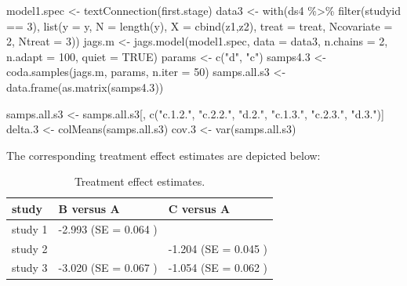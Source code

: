\documentclass[
  letterpaper,
  DIV=11,
  numbers=noendperiod]{scrreprt}
\newenvironment{Shaded}{\begin{snugshade}}{\end{snugshade}}
\newcommand{\AttributeTok}[1]{\textcolor[rgb]{0.40,0.45,0.13}{#1}}
\newcommand{\ConstantTok}[1]{\textcolor[rgb]{0.56,0.35,0.01}{#1}}
\newcommand{\DecValTok}[1]{\textcolor[rgb]{0.68,0.00,0.00}{#1}}
\newcommand{\FloatTok}[1]{\textcolor[rgb]{0.68,0.00,0.00}{#1}}
\newcommand{\FunctionTok}[1]{\textcolor[rgb]{0.28,0.35,0.67}{#1}}
\newcommand{\NormalTok}[1]{\textcolor[rgb]{0.00,0.23,0.31}{#1}}
\newcommand{\OtherTok}[1]{\textcolor[rgb]{0.00,0.23,0.31}{#1}}
\newcommand{\SpecialCharTok}[1]{\textcolor[rgb]{0.37,0.37,0.37}{#1}}
\newcommand{\StringTok}[1]{\textcolor[rgb]{0.13,0.47,0.30}{#1}}
\begin{document}
\begin{Shaded}
\begin{Highlighting}[]
\NormalTok{model1.spec }\OtherTok{\textless{}{-}} \FunctionTok{textConnection}\NormalTok{(first.stage) }
\NormalTok{data3 }\OtherTok{\textless{}{-}} \FunctionTok{with}\NormalTok{(ds4 }\SpecialCharTok{\%\textgreater{}\%} \FunctionTok{filter}\NormalTok{(studyid }\SpecialCharTok{==} \DecValTok{3}\NormalTok{), }
              \FunctionTok{list}\NormalTok{(}\AttributeTok{y =}\NormalTok{ y,}
                   \AttributeTok{N =} \FunctionTok{length}\NormalTok{(y), }
                   \AttributeTok{X =} \FunctionTok{cbind}\NormalTok{(z1,z2),  }
                   \AttributeTok{treat =}\NormalTok{ treat,}
                   \AttributeTok{Ncovariate =} \DecValTok{2}\NormalTok{, }
                   \AttributeTok{Ntreat =} \DecValTok{3}\NormalTok{))}
\NormalTok{jags.m }\OtherTok{\textless{}{-}} \FunctionTok{jags.model}\NormalTok{(model1.spec, }\AttributeTok{data =}\NormalTok{ data3, }\AttributeTok{n.chains =} \DecValTok{2}\NormalTok{, }\AttributeTok{n.adapt =} \DecValTok{100}\NormalTok{,}
                     \AttributeTok{quiet =} \ConstantTok{TRUE}\NormalTok{)}
\NormalTok{params }\OtherTok{\textless{}{-}} \FunctionTok{c}\NormalTok{(}\StringTok{"d"}\NormalTok{, }\StringTok{"c"}\NormalTok{) }
\NormalTok{samps4}\FloatTok{.3} \OtherTok{\textless{}{-}} \FunctionTok{coda.samples}\NormalTok{(jags.m, params, }\AttributeTok{n.iter =} \DecValTok{50}\NormalTok{)}
\NormalTok{samps.all.s3 }\OtherTok{\textless{}{-}} \FunctionTok{data.frame}\NormalTok{(}\FunctionTok{as.matrix}\NormalTok{(samps4}\FloatTok{.3}\NormalTok{))}

\NormalTok{samps.all.s3 }\OtherTok{\textless{}{-}}\NormalTok{ samps.all.s3[, }\FunctionTok{c}\NormalTok{(}\StringTok{"c.1.2."}\NormalTok{, }\StringTok{"c.2.2."}\NormalTok{, }\StringTok{"d.2."}\NormalTok{, }\StringTok{"c.1.3."}\NormalTok{, }
                                 \StringTok{"c.2.3."}\NormalTok{, }\StringTok{"d.3."}\NormalTok{)]}
\NormalTok{delta}\FloatTok{.3} \OtherTok{\textless{}{-}} \FunctionTok{colMeans}\NormalTok{(samps.all.s3)}
\NormalTok{cov}\FloatTok{.3} \OtherTok{\textless{}{-}} \FunctionTok{var}\NormalTok{(samps.all.s3)}
\end{Highlighting}
\end{Shaded}

The corresponding treatment effect estimates are depicted below:

\hypertarget{tbl-results_nma_stage1}{}
\begin{table}[!h]
\caption{\label{tbl-results_nma_stage1}Treatment effect estimates. }\tabularnewline

\centering
\begin{tabular}{lll}
\toprule
study & B versus A & C versus A\\
\midrule
study 1 & -2.993 (SE =  0.064 ) & \\
study 2 &  & -1.204 (SE =  0.045 )\\
study 3 & -3.020 (SE =  0.067 ) & -1.054 (SE =  0.062 )\\
\bottomrule
\end{tabular}
\end{table}
\end{document}
